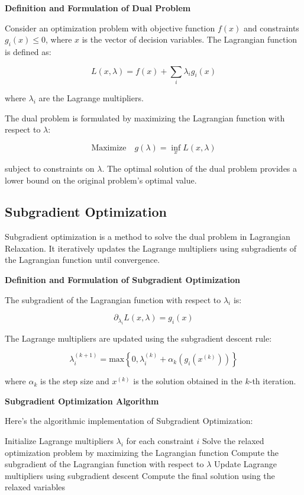 \documentclass[12pt]{book} %
\begin{document}
\textbf{Definition and Formulation of Dual Problem}

Consider an optimization problem with objective function $f(x)$ and constraints $g_i(x) \leq 0$, where $x$ is the vector of decision variables. The Lagrangian function is defined as:

\[
L(x, \lambda) = f(x) + \sum_{i} \lambda_i g_i(x)
\]

where $\lambda_i$ are the Lagrange multipliers.

The dual problem is formulated by maximizing the Lagrangian function with respect to $\lambda$:

\[
\text{Maximize} \quad g(\lambda) = \inf_{x} L(x, \lambda)
\]

subject to constraints on $\lambda$. The optimal solution of the dual problem provides a lower bound on the original problem's optimal value.

\subsection{Subgradient Optimization}

Subgradient optimization is a method to solve the dual problem in Lagrangian Relaxation. It iteratively updates the Lagrange multipliers using subgradients of the Lagrangian function until convergence.

\textbf{Definition and Formulation of Subgradient Optimization}

The subgradient of the Lagrangian function with respect to $\lambda_i$ is:

\[
\partial_{\lambda_i} L(x, \lambda) = g_i(x)
\]

The Lagrange multipliers are updated using the subgradient descent rule:

\[
\lambda_i^{(k+1)} = \text{max}\left\{0, \lambda_i^{(k)} + \alpha_k \left( g_i(x^{(k)}) \right)\right\}
\]

where $\alpha_k$ is the step size and $x^{(k)}$ is the solution obtained in the $k$-th iteration.

\textbf{Subgradient Optimization Algorithm}

Here's the algorithmic implementation of Subgradient Optimization:
\FloatBarrier
\begin{algorithm}[H]
\caption{Subgradient Optimization}
\begin{algorithmic}[1]
\State Initialize Lagrange multipliers $\lambda_i$ for each constraint $i$
    \State Solve the relaxed optimization problem by maximizing the Lagrangian function
    \State Compute the subgradient of the Lagrangian function with respect to $\lambda$
    \State Update Lagrange multipliers using subgradient descent
\EndWhile
\State Compute the final solution using the relaxed variables
\end{algorithmic}
\end{algorithm}
\end{document}
